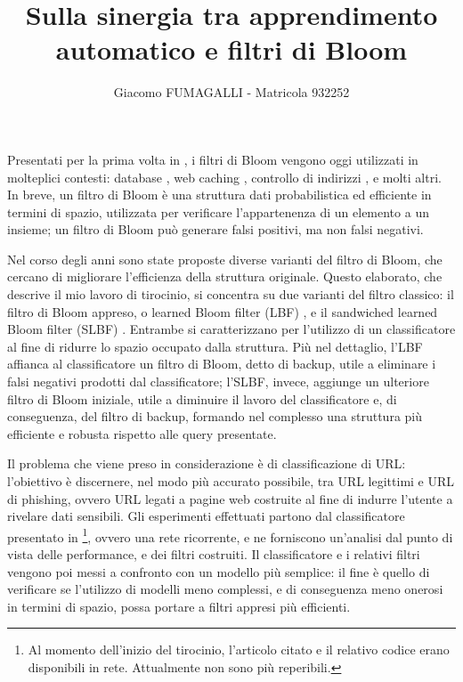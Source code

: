 \documentclass[4apaper,11pt]{article}
\title{Sulla sinergia tra apprendimento automatico e filtri di Bloom}
\author{Giacomo FUMAGALLI - Matricola 932252}
\begin{document}
\maketitle
Presentati per la prima volta in \cite{Bloom1970SpacetimeTI}, i filtri di Bloom vengono oggi utilizzati in molteplici contesti: database \cite{kraska2018case}, web caching \cite{Maggs15algorithmicnuggets}, controllo di indirizzi \cite{Dharmapurikar2006LongestPM}, e molti altri. In breve, un filtro di Bloom è una struttura dati probabilistica ed efficiente in termini di spazio, utilizzata per verificare l'appartenenza di un elemento a un insieme; un filtro di Bloom può generare falsi positivi, ma non falsi negativi.

Nel corso degli anni sono state proposte diverse varianti del filtro di Bloom, che cercano di migliorare l'efficienza della struttura originale. Questo elaborato, che descrive il mio lavoro di tirocinio, si concentra su due varianti del filtro classico: il filtro di Bloom appreso, o learned Bloom filter (LBF) \cite{kraska2018case}, e il sandwiched learned Bloom filter (SLBF) \cite{10.5555/3326943.3326986}. Entrambe si caratterizzano per l'utilizzo di un classificatore al fine di ridurre lo spazio occupato dalla struttura. Più nel dettaglio, l'LBF affianca al classificatore un filtro di Bloom, detto di backup, utile a eliminare i falsi negativi prodotti dal classificatore; l'SLBF, invece, aggiunge un ulteriore filtro di Bloom iniziale, utile a diminuire il lavoro del classificatore e, di conseguenza, del filtro di backup, formando nel complesso una struttura più efficiente e robusta rispetto alle query presentate.

Il problema che viene preso in considerazione è di classificazione di URL: l'obiettivo è discernere, nel modo più accurato possibile, tra URL legittimi e URL di phishing, ovvero URL legati a pagine web costruite al fine di indurre l'utente a rivelare dati sensibili. Gli esperimenti effettuati partono dal classificatore presentato in \cite{ma2020}\footnote{Al momento dell'inizio del tirocinio, l'articolo citato e il relativo codice erano disponibili in rete. Attualmente non sono più reperibili.}, ovvero una rete ricorrente, e ne forniscono un'analisi dal punto di vista delle performance, e dei filtri costruiti. Il classificatore e i relativi filtri vengono poi messi a confronto con un modello più semplice: il fine è quello di verificare se l'utilizzo di modelli meno complessi, e di conseguenza meno onerosi in termini di spazio, possa portare a filtri appresi più efficienti.
\end{document}
